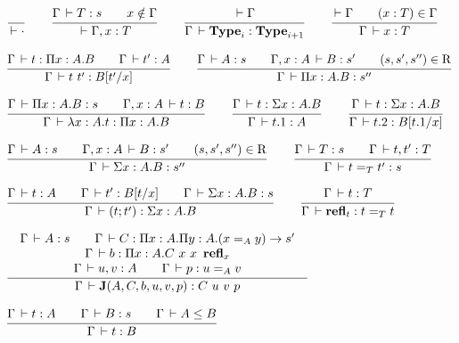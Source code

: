 \documentclass[a4paper,english]{lipics-utf8x}
\begin{document}
  \begin{center}
  \(
    \ru{}{\der \cdot}
    \qquad
    \ru{\Gamma \der T : s \qquad
        x \notin \Gamma
      }{\der \Gamma, x : T}
    \qquad
    \ru{\der \Gamma
      }{\Gamma \der \Type_i : \Type_{i+1}}
    \qquad
    \ru{\der \Gamma \qquad
        (x : T) \in \Gamma
      }{\Gamma \der x : T}
  \)
  \end{center}

  \begin{center}
  \(
    \ru{\Gamma \der t : \Pi x:A.B \qquad
        \Gamma \der t' : A
      }{\Gamma \der t\ t' : B[t'/x]}
    \qquad
    \ru{\Gamma \der A : s \qquad
        \Gamma, x:A \der B : s' \qquad
        (s,s',s'') \in \R
      }{\Gamma \der \Pi x:A.B : s''}
  \)
  \end{center}

  \begin{center}
  \(
    \ru{\Gamma \der \Pi x:A.B : s \qquad
        \Gamma, x:A \der t : B
      }{\Gamma \der \lambda x:A.t : \Pi x:A.B}
    \qquad
    \ru{\Gamma \der t : \Sigma x:A.B
      }{\Gamma \der t.1 : A}
    \qquad
    \ru{\Gamma \der t : \Sigma x:A.B
      }{\Gamma \der t.2 : B[t.1/x]}
  \)
  \end{center}

  \begin{center}
  \(
    \ru{\Gamma \der A : s \qquad
        \Gamma, x:A \der B : s' \qquad
        (s,s',s'') \in \R
      }{\Gamma \der \Sigma x:A.B : s''}
    \qquad
    \ru{\Gamma \der T : s \qquad
        \Gamma \der t,t' : T
      }{\Gamma \der t =_T t' : s}
  \)
  \end{center}

  \begin{center}
  \(
    \ru{\Gamma \der t : A \qquad
        \Gamma \der t' : B[t/x] \qquad
        \Gamma \der \Sigma x:A.B : s
      }{\Gamma \der (t;t') : \Sigma x:A.B}
    \qquad
    \ru{\Gamma \der t : T
      }{\Gamma \der \refl_t : t =_T t}
  \)
  \end{center}

  \begin{center}
  \(
    \tru{\Gamma \der A : s \qquad
         \Gamma \der C : \Pi x:A. \Pi y:A. (x =_A y) \to s'
       }{\Gamma \der b : \Pi x:A. C\ x\ x\ \refl_x
       }{\Gamma \der u, v : A \qquad
         \Gamma \der p : u =_A v
       }{\Gamma \der \J (A,C,b,u,v,p) : C\ u\ v\ p}
  \)
  \end{center}

  \begin{center}
  \(
    \ru{\Gamma \der t : A \qquad
        \Gamma \der B : s \qquad
        \Gamma \der A \le B
      }{\Gamma \der t : B}
  \)
  \end{center}
\end{document}
